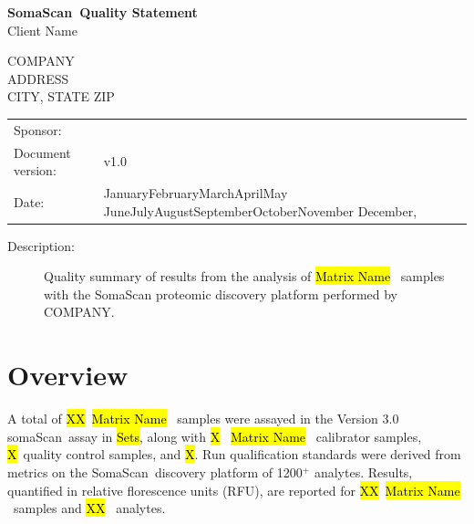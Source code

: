 \documentclass[11pt]{article}
\newcommand{\ClientName}{Client Name}    %
\newcommand{\SponsorName}{}
\newcommand{\NumSamples}{\hl{XX}}
\newcommand{\NumCalibrators}{\hl{X} }
\newcommand{\NumBuffers}{\hl{X}}
\newcommand{\NumQC}{\hl{X}}
\newcommand{\NumApts}{\hl{XX} }                              %
\newcommand{\MatrixName}{\hl{Matrix Name} }                  %
\newcommand{\Sets}{\hl{Sets}}              %
\def \today{\ifcase\month\or January\or February\or March\or April\or May\or
            June\or July\or August\or September\or October\or November\or
            December\fi \space \number\day, \space \number\year}
\def \mytitle{\textbf{SomaScan\texttrademark~Quality Statement}}
\begin{document}
\noindent \mytitle \\
\ClientName \\

\vspace{1cm}

\noindent COMPANY \\
ADDRESS \\
CITY, STATE \hspace{0.2cm} ZIP \\


\hspace{0.5\textwidth}
\begin{tabular}{ll}
  Sponsor: & \SponsorName \\
  Document version: & v1.0 \\
  Date: & \today \\
\end{tabular}


\vspace{1cm}

\begin{description}
  \item[Description:] Quality summary of results from the analysis of
    \MatrixName~samples with the SomaScan proteomic discovery platform
    performed by COMPANY.
\end{description}


\section{Overview} \label{sec:over}
A total of \NumSamples~\MatrixName~samples were assayed in the Version 3.0
somaScan\texttrademark~assay in \Sets, along with
\NumCalibrators~\MatrixName~calibrator samples, \NumQC~quality control samples,
and \NumBuffers.
Run qualification standards were derived from metrics on the
SomaScan\texttrademark~discovery platform of 1200$^+$ analytes\texttrademark. 
Results, quantified in relative florescence units (RFU), are reported for
\NumSamples~\MatrixName~samples and \NumApts~analytes.
\end{document}
